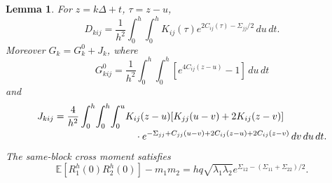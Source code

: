 \documentclass[11pt,a4paper]{amsart}
\theoremstyle{plain}
\newtheorem{lemma}[theorem]{Lemma}
\theoremstyle{definition}
\theoremstyle{remark}
\newcommand{\EE}{\mathbb{E}}
\begin{document}
\begin{lemma}\label{lem:exact-moments}
For $z=k\Delta+t$, $\tau=z-u$,
\begin{equation}\label{eq:exact-cubic}
 D_{kij}=\frac1{h^2}\int_0^h\!\int_0^h
 K_{ij}(\tau)e^{2C_{ij}(\tau)-\Sigma_{jj}/2}\,du\,dt.
\end{equation}
Moreover $G_k=G_k^0+J_k$, where
\begin{equation}\label{eq:cov-moments}
 G_{kij}^0=\frac1{h^2}\int_0^h\!\int_0^h
                [e^{4C_{ij}(z-u)}-1]\,du\,dt
\end{equation}
and
\begin{align}\label{eq:J}
 J_{kij}=\frac4{h^2}\int_0^h\!\int_0^h\!\int_0^u
 &K_{ij}(z-u)[K_{jj}(u-v)+2K_{ij}(z-v)]\notag\\[-2pt]
 &\quad\cdot e^{-\Sigma_{jj}+C_{jj}(u-v)
                    +2C_{ij}(z-u)+2C_{ij}(z-v)}\,dv\,du\,dt.
\end{align}
The same-block cross moment satisfies
\begin{equation}\label{eq:cross-second}
 \EE[R_1^h(0)R_2^h(0)]-m_1m_2
 =h q\sqrt{\lambda_1\lambda_2}
       e^{\Sigma_{12}-(\Sigma_{11}+\Sigma_{22})/2}.
\end{equation}
\end{lemma}
\end{document}
